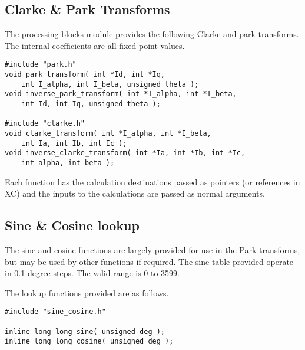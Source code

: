 \subsection{Clarke \& Park Transforms}
The processing blocks module provides the following Clarke and park transforms. The internal coefficients are all fixed point values.

\begin{lstlisting}
#include "park.h"
void park_transform( int *Id, int *Iq, 
	int I_alpha, int I_beta, unsigned theta );
void inverse_park_transform( int *I_alpha, int *I_beta, 
	int Id, int Iq, unsigned theta );

#include "clarke.h"
void clarke_transform( int *I_alpha, int *I_beta, 
	int Ia, int Ib, int Ic );
void inverse_clarke_transform( int *Ia, int *Ib, int *Ic, 
	int alpha, int beta );
\end{lstlisting}

Each function has the calculation destinations passed as pointers (or references in XC) and the inputs to the calculations are passed as normal arguments.


\subsection{Sine \& Cosine lookup}
The sine and cosine functions are largely provided for use in the Park transforms, but may be used by other functions if required. The sine table provided operate in 0.1 degree steps. The valid range is 0 to 3599.

The lookup functions provided are as follows.

\begin{lstlisting}
#include "sine_cosine.h"

inline long long sine( unsigned deg );
inline long long cosine( unsigned deg );
\end{lstlisting}
